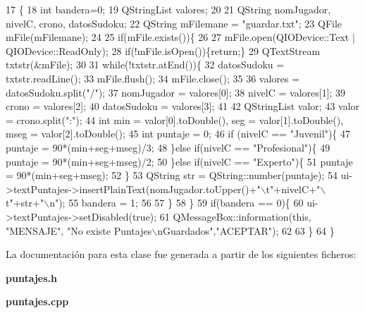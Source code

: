 \begin{DoxyCode}
17                           \{
18     \textcolor{keywordtype}{int} bandera=0;
19     QStringList  valores;
20 
21     QString nomJugador, nivelC, crono, datosSudoku;
22     QString mFilemane = \textcolor{stringliteral}{"guardar.txt"};
23     QFile mFile(mFilemane);
24 
25     \textcolor{keywordflow}{if}(mFile.exists())\{
26 
27         mFile.open(QIODevice::Text | QIODevice::ReadOnly);
28         \textcolor{keywordflow}{if}(!mFile.isOpen())\{\textcolor{keywordflow}{return};\}
29         QTextStream txtstr(&mFile);
30 
31         \textcolor{keywordflow}{while}(!txtstr.atEnd())\{
32             datosSudoku = txtstr.readLine();
33             mFile.flush();
34             mFile.close();
35 
36             valores = datosSudoku.split(\textcolor{stringliteral}{"/"});
37             nomJugador = valores[0];
38             nivelC = valores[1];
39             crono = valores[2];
40             datosSudoku = valores[3];
41 
42             QStringList valor;
43             valor = crono.split(\textcolor{stringliteral}{":"});
44             \textcolor{keywordtype}{int} min = valor[0].toDouble(), seg = valor[1].toDouble(), mseg = valor[2].toDouble();
45             \textcolor{keywordtype}{int} puntaje = 0;
46             \textcolor{keywordflow}{if} (nivelC == \textcolor{stringliteral}{"Juvenil"})\{
47                 puntaje = 90*(min+seg+mseg)/3;
48             \}\textcolor{keywordflow}{else} \textcolor{keywordflow}{if}(nivelC == \textcolor{stringliteral}{"Profesional"})\{
49                 puntaje = 90*(min+seg+mseg)/2;
50             \}\textcolor{keywordflow}{else} \textcolor{keywordflow}{if}(nivelC == \textcolor{stringliteral}{"Experto"})\{
51                 puntaje = 90*(min+seg+mseg);
52             \}
53             QString str = QString::number(puntaje);
54             ui->textPuntajes->insertPlainText(nomJugador.toUpper()+\textcolor{stringliteral}{"\(\backslash\)t"}+nivelC+\textcolor{stringliteral}{"\(\backslash\)t"}+str+\textcolor{stringliteral}{"\(\backslash\)n"});
55             bandera = 1;
56 
57         \}
58     \}
59     \textcolor{keywordflow}{if}(bandera == 0)\{
60         ui->textPuntajes->setDisabled(\textcolor{keyword}{true});
61         QMessageBox::information(\textcolor{keyword}{this}, \textcolor{stringliteral}{"MENSAJE"}, \textcolor{stringliteral}{"No existe Puntajes\(\backslash\)nGuardados"},\textcolor{stringliteral}{"ACEPTAR"});
62 
63     \}
64 \}
\end{DoxyCode}


La documentación para esta clase fue generada a partir de los siguientes ficheros\-:\begin{DoxyCompactItemize}
\item 
{\bf puntajes.\-h}\item 
{\bf puntajes.\-cpp}\end{DoxyCompactItemize}

